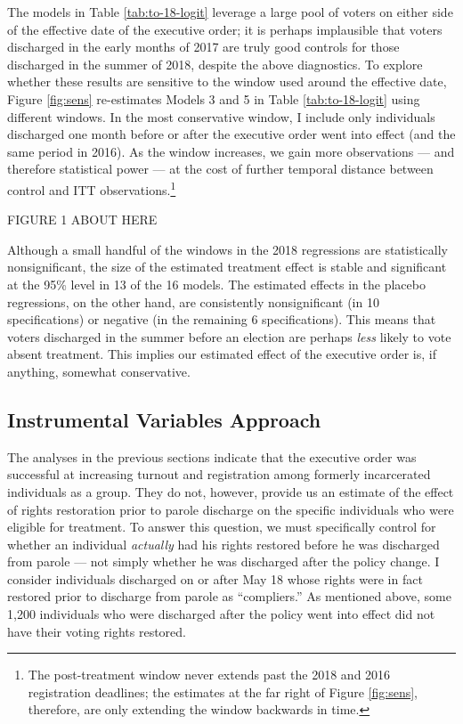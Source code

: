 \documentclass[
  12pt,
]{article}
\begin{document}
The models in Table \ref{tab:to-18-logit} leverage a large pool of voters on either side of the effective date of the executive order; it is perhaps implausible that voters discharged in the early months of 2017 are truly good controls for those discharged in the summer of 2018, despite the above diagnostics. To explore whether these results are sensitive to the window used around the effective date, Figure \ref{fig:sens} re-estimates Models 3 and 5 in Table \ref{tab:to-18-logit} using different windows. In the most conservative window, I include only individuals discharged one month before or after the executive order went into effect (and the same period in 2016). As the window increases, we gain more observations --- and therefore statistical power --- at the cost of further temporal distance between control and ITT observations.\footnote{The post-treatment window never extends past the 2018 and 2016 registration deadlines; the estimates at the far right of Figure \ref{fig:sens}, therefore, are only extending the window backwards in time.}

FIGURE 1 ABOUT HERE

Although a small handful of the windows in the 2018 regressions are statistically nonsignificant, the size of the estimated treatment effect is stable and significant at the 95\% level in 13 of the 16 models. The estimated effects in the placebo regressions, on the other hand, are consistently nonsignificant (in 10 specifications) or negative (in the remaining 6 specifications). This means that voters discharged in the summer before an election are perhaps \emph{less} likely to vote absent treatment. This implies our estimated effect of the executive order is, if anything, somewhat conservative.

\hypertarget{instrumental-variables-approach}{%
\subsection*{Instrumental Variables Approach}\label{instrumental-variables-approach}}

The analyses in the previous sections indicate that the executive order was successful at increasing turnout and registration among formerly incarcerated individuals as a group. They do not, however, provide us an estimate of the effect of rights restoration prior to parole discharge on the specific individuals who were eligible for treatment. To answer this question, we must specifically control for whether an individual \emph{actually} had his rights restored before he was discharged from parole --- not simply whether he was discharged after the policy change. I consider individuals discharged on or after May 18 whose rights were in fact restored prior to discharge from parole as ``compliers.'' As mentioned above, some 1,200 individuals who were discharged after the policy went into effect did not have their voting rights restored.
\end{document}
